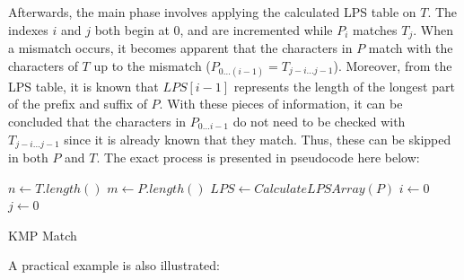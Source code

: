 \documentclass[12pt]{article}
\begin{document}
Afterwards, the main phase involves applying the calculated LPS table on $T$. The
indexes $i$ and $j$ both begin at 0, and are incremented while $P_{i}$ matches $T_{j}$. When a
mismatch occurs, it becomes apparent that the characters in $P$ match with the characters
of $T$ up to the mismatch ($P_{0 \ldots (i-1)} = T_{j-i \ldots j-1}$). Moreover, from the LPS table, it is known
that $LPS[i - 1]$ represents the length of the longest part of the prefix and suffix of $P$.
With these pieces of information, it can be concluded that the characters in $P_{0 \ldots i-1}$ do
not need to be checked with $T_{j-i \ldots j-1}$ since it is already known that they match. Thus,
these can be skipped in both $P$ and $T$. The exact process is presented in pseudocode here
below:

\begin{center}
\begin{singlespace}
\begin{minipage}{0.75\linewidth}
\begin{algorithm}[H]
	$n \leftarrow T.length()$ \;
	$m \leftarrow P.length()$ \;
	$LPS \leftarrow CalculateLPSArray(P)$ \;
	$i \leftarrow 0$ \;
	$j \leftarrow 0$ \;

	\bigskip

	\caption{KMP Match}
\end{algorithm}
\end{minipage}
\end{singlespace}
\end{center}

A practical example is also illustrated:
\end{document}
